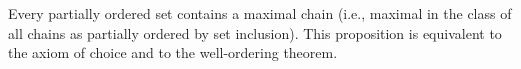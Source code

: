 Every partially ordered set contains a maximal chain (i.e., maximal in the class of all chains as partially ordered by set inclusion). This proposition is equivalent to the axiom of choice and to the well-ordering theorem.
